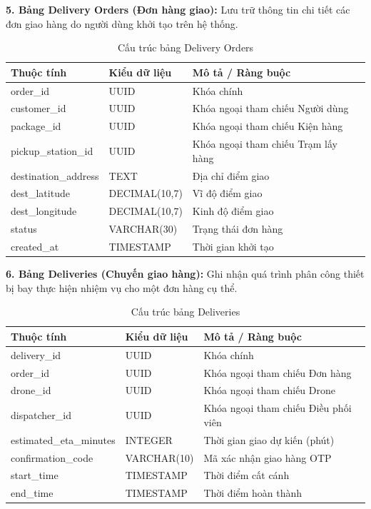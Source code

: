 \noindent\textbf{5. Bảng Delivery Orders (Đơn hàng giao):} Lưu trữ thông tin chi tiết các đơn giao hàng do người dùng khởi tạo trên hệ thống.
\begin{table}[htbp]
	\centering
	\begin{tabular}{|l|l|l|}
		\hline
		\textbf{Thuộc tính} & \textbf{Kiểu dữ liệu} & \textbf{Mô tả / Ràng buộc} \\ \hline
		order\_id & UUID & Khóa chính \\ \hline
		customer\_id & UUID & Khóa ngoại tham chiếu Người dùng \\ \hline
		package\_id & UUID & Khóa ngoại tham chiếu Kiện hàng \\ \hline
		pickup\_station\_id & UUID & Khóa ngoại tham chiếu Trạm lấy hàng \\ \hline
		destination\_address & TEXT & Địa chỉ điểm giao \\ \hline
		dest\_latitude & DECIMAL(10,7) & Vĩ độ điểm giao \\ \hline
		dest\_longitude & DECIMAL(10,7) & Kinh độ điểm giao \\ \hline
		status & VARCHAR(30) & Trạng thái đơn hàng \\ \hline
		created\_at & TIMESTAMP & Thời gian khởi tạo \\ \hline
	\end{tabular}
	\caption{Cấu trúc bảng Delivery Orders}
\end{table}

\noindent\textbf{6. Bảng Deliveries (Chuyến giao hàng):} Ghi nhận quá trình phân công thiết bị bay thực hiện nhiệm vụ cho một đơn hàng cụ thể.
\begin{table}[htbp]
	\centering
	\begin{tabular}{|l|l|l|}
		\hline
		\textbf{Thuộc tính} & \textbf{Kiểu dữ liệu} & \textbf{Mô tả / Ràng buộc} \\ \hline
		delivery\_id & UUID & Khóa chính \\ \hline
		order\_id & UUID & Khóa ngoại tham chiếu Đơn hàng \\ \hline
		drone\_id & UUID & Khóa ngoại tham chiếu Drone \\ \hline
		dispatcher\_id & UUID & Khóa ngoại tham chiếu Điều phối viên \\ \hline
		estimated\_eta\_minutes & INTEGER & Thời gian giao dự kiến (phút) \\ \hline
		confirmation\_code & VARCHAR(10) & Mã xác nhận giao hàng OTP \\ \hline
		start\_time & TIMESTAMP & Thời điểm cất cánh \\ \hline
		end\_time & TIMESTAMP & Thời điểm hoàn thành \\ \hline
	\end{tabular}
	\caption{Cấu trúc bảng Deliveries}
\end{table}

